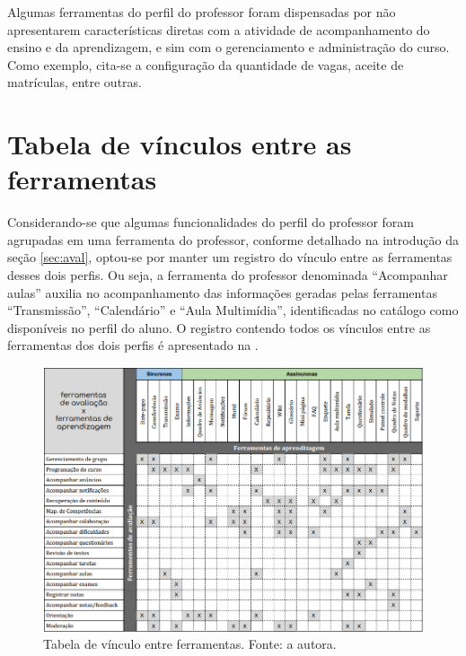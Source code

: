 Algumas ferramentas do perfil do professor foram dispensadas por não apresentarem características diretas com a atividade de acompanhamento do ensino e da aprendizagem, e sim com o gerenciamento e administração do curso. Como exemplo, cita-se a configuração da quantidade de vagas, aceite de matrículas, entre outras.

\section{Tabela de vínculos entre as ferramentas}
Considerando-se que algumas funcionalidades do perfil do professor foram agrupadas em uma ferramenta do professor, conforme detalhado na introdução da seção \ref{sec:aval}, optou-se por manter um registro do vínculo entre as ferramentas desses dois perfis. Ou seja, a ferramenta do professor denominada ``Acompanhar aulas'' auxilia no acompanhamento das informações geradas pelas ferramentas ``Transmissão'', ``Calendário'' e ``Aula Multimídia'', identificadas no catálogo como disponíveis no perfil do aluno. O registro contendo todos os vínculos entre as ferramentas dos dois perfis é apresentado na .
    \begin{figure}[h]
        \centering
            \includegraphics[width=\textwidth]{img/ferramentas_avaliacao.png}
        \caption{Tabela de vínculo entre ferramentas. Fonte: a autora.}
        \label{fig:ferramentas}
    \end{figure}

